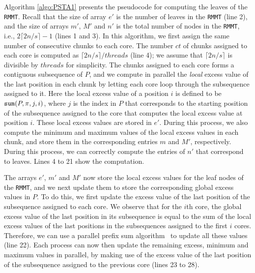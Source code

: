 
Algorithm \ref{algo:PSTA1} presents the pseudocode for computing the
leaves of the {\tt RMMT}.  Recall that the size of array $e'$
is the number of leaves in the {\tt RMMT} (line 2), and the size of
arrays $m'$, $M'$ and $n'$ is the total number
of nodes in the {\tt RMMT}, i.e., $2\lceil 2n/s \rceil-1$ (lines 1 and
3).  In this algorithm, we first assign the same number of consecutive
chunks to each core.  The number $ct$ of chunks assigned to each core
is computed as $\lceil 2n / s\rceil / threads $ (line 4); we assume
that $\lceil 2n / s\rceil$ is divisible by $threads$ for simplicity.
The chunks assigned to each core forms a contiguous subsequence of
$P$, and we compute in parallel the {\em local} excess value of the
last position in each chunk by letting each core loop through the
subsequence assigned to it.  Here the local excess value of a position
$i$ is defined to be $\mathtt{sum}(P,\pi,j,i)$, where $j$ is the index in
$P$ that corresponds to the starting position of the subsequence
assigned to the core that computes the local excess value at position
$i$.  These local excess values are stored in $e'$.  During this
process, we also compute the minimum and maximum values of the local
excess values in each chunk, and store them in the corresponding
entries $m$ and $M'$, respectively.  During this process, we can
correctly compute the entries of $n'$ that correspond to leaves.
Lines 4 to 21 show the computation.

The arrays $e'$, $m'$ and $M'$ now store the local excess values for
the leaf nodes of the {\tt RMMT}, and we next update them to store the
corresponding global excess values in $P$.  To do this, we first
update the excess value of the last position of the subsequence
assigned to each core.  We observe that for the $i$th core, the global
excess value of the last position in its subsequence is equal to the
sum of the local excess values of the last positions in the
subsequences assigned to the first $i$ cores.  Therefore, we can use a
parallel prefix sum algorithm~\cite{Helman2001265} to update all these
values (line 22).  Each process can now then update the remaining
excess, minimum and maximum values in parallel, by making use of the
excess value of the last position of the subsequence assigned to the
previous core (lines 23 to 28).

